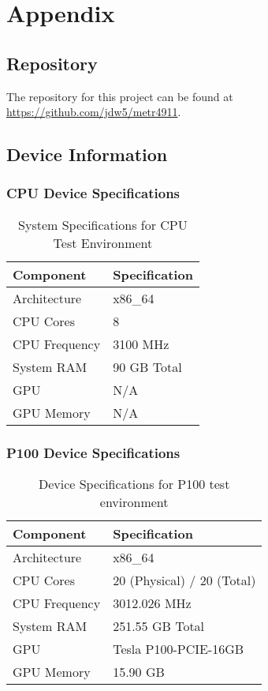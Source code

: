 \chapter{Appendix}

\section{Repository}
The repository for this project can be found at \url{https://github.com/jdw5/metr4911}.

\section{Device Information}
\label{app:device_information}

\subsection{CPU Device Specifications}
\begin{table}[h]
    \centering
    \begin{tabular}{|l|l|}
        \hline
        \textbf{Component} & \textbf{Specification} \\
        \hline
        Architecture & x86\_64 \\
        CPU Cores & 8 \\
        CPU Frequency & 3100 MHz \\
        System RAM & 90 GB Total \\
        GPU & N/A \\
        GPU Memory & N/A \\
        \hline
    \end{tabular}
    \caption{System Specifications for CPU Test Environment}
    \label{tab:cpu_specs}
\end{table}

\subsection{P100 Device Specifications}
\begin{table}[h]
    \centering
    \begin{tabular}{|l|l|}
        \hline
        \textbf{Component} & \textbf{Specification} \\
        \hline
        Architecture & x86\_64 \\
        CPU Cores & 20 (Physical) / 20 (Total) \\
        CPU Frequency & 3012.026 MHz \\
        System RAM & 251.55 GB Total \\
        GPU & Tesla P100-PCIE-16GB \\
        GPU Memory & 15.90 GB \\
        \hline
    \end{tabular}
    \caption{Device Specifications for P100 test environment}
    \label{tab:p100_specs}
\end{table}

